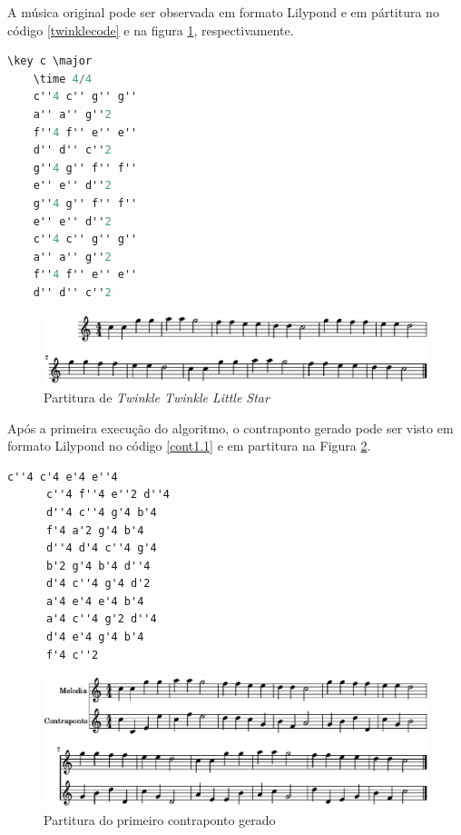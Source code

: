     A música original pode ser observada em formato Lilypond e em pártitura no código \ref{twinklecode} e na figura \ref{twinkleoriginal}, respectivamente.

    \begin{lstlisting}[language={C}, caption={\textit{Twinkle Twinkle Little Star}}, label={twinklecode}]
    \key c \major
    \time 4/4
    c''4 c'' g'' g''
    a'' a'' g''2
    f''4 f'' e'' e''
    d'' d'' c''2
    g''4 g'' f'' f''
    e'' e'' d''2
    g''4 g'' f'' f''
    e'' e'' d''2
    c''4 c'' g'' g''
    a'' a'' g''2
    f''4 f'' e'' e''
    d'' d'' c''2
    \end{lstlisting}

    \begin{figure}[htb]
      \centering
      \includegraphics[scale=0.6]{figuras/twinkleoriginal.eps}
      \caption{Partitura de \textit{Twinkle Twinkle Little Star}}
      \label{twinkleoriginal}
    \end{figure}

    Após a primeira execução do algoritmo, o contraponto gerado pode ser visto em formato Lilypond no código \ref{cont1.1} e em partitura na Figura \ref{cont1.2}.

    \begin{lstlisting}[caption={Primeiro contraponto gerado}, label={cont1.1}]
      c''4 c'4 e'4 e''4
      c''4 f''4 e''2 d''4
      d''4 c''4 g'4 b'4
      f'4 a'2 g'4 b'4
      d''4 d'4 c''4 g'4
      b'2 g'4 b'4 d''4
      d'4 c''4 g'4 d'2
      a'4 e'4 e'4 b'4
      a'4 c''4 g'2 d''4
      d'4 e'4 g'4 b'4
      f'4 c''2
    \end{lstlisting}

    \begin{figure}[htb]
      \centering
      \includegraphics[scale=0.6]{figuras/cont1.2.eps}
      \caption{Partitura do primeiro contraponto gerado}
      \label{cont1.2}
    \end{figure}

